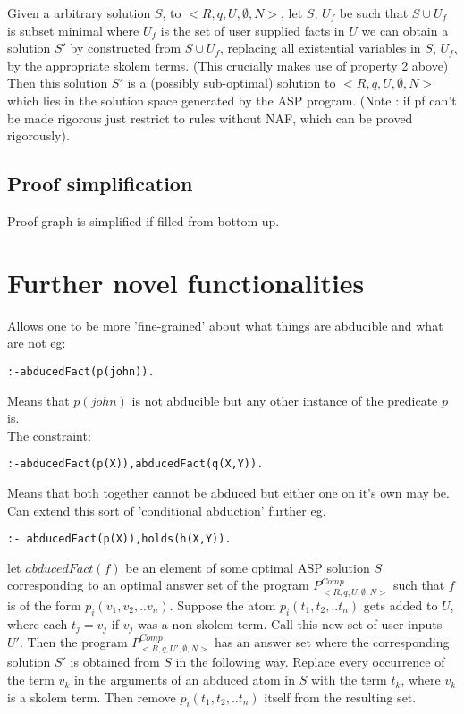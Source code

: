 \documentclass[sigconf]{acmart}
\begin{document}
Given a arbitrary solution $S$, to $<R,q,U,\emptyset,N>$, let $S$, $U_{f}$ be such that $S\cup U_{f}$ is subset minimal where $U_{f}$ is the set of user supplied facts in $U$ we can obtain a solution $S'$ by constructed from $S\cup U_{f}$, replacing all existential variables in $S$, $U_{f}$, by the appropriate skolem terms. (This crucially makes use of property 2 above) Then this solution $S'$ is a (possibly sub-optimal) solution to $<R,q,U,\emptyset,N>$ which lies in the solution space generated by the ASP program.  (Note : if pf can't be made rigorous just restrict to rules without NAF, which can be proved rigorously).
\subsection{Proof simplification}
Proof graph is simplified if filled from bottom up.

\section{Further novel functionalities}
Allows one to be more 'fine-grained' about what things are abducible and what are not eg:
\begin{verbatim}
:-abducedFact(p(john)).    
\end{verbatim}
Means that $p(john)$ is not abducible but any other instance of the predicate $p$ is.\\
\newline
The constraint:
\begin{verbatim}
:-abducedFact(p(X)),abducedFact(q(X,Y)).
\end{verbatim}
Means that both together cannot be abduced but either one on it's own may be. Can extend this sort of 'conditional abduction' further eg.
\begin{verbatim}
:- abducedFact(p(X)),holds(h(X,Y)).  
\end{verbatim}


let $abducedFact(f)$ be an element of some optimal ASP solution $S$ corresponding to an optimal answer set of the program $P_{<R,q,U,\emptyset,N>}^{Comp}$ such that $f$ is of the form $p_{i}(v_{1},v_{2},..v_{n})$. Suppose the atom $p_{i}(t_{1},t_{2},..t_{n})$ gets added to $U$, where each $t_{j} = v_{j}$ if $v_{j}$ was a non skolem term. Call this new set of user-inputs $U'$. Then the program $P_{<R,q,U',\emptyset,N>}^{Comp}$ has an answer set where the corresponding solution $S'$ is obtained from $S$ in the following way. Replace every occurrence of the term $v_{k}$ in the arguments of an abduced atom in $S$ with the term $t_{k}$, where $v_{k}$ is a skolem term. Then remove $p_{i}(t_{1},t_{2},..t_{n})$ itself from the resulting set.
\end{document}

